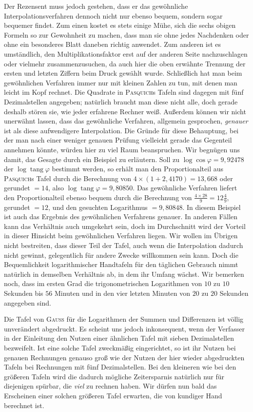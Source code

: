 Der Rezensent muss jedoch gestehen, dass er das gewöhnliche Interpolationsverfahren dennoch nicht nur ebenso bequem, sondern sogar bequemer findet. Zum einen kostet es stets einige Mühe, sich die sechs obigen Formeln so zur Gewohnheit zu machen, dass man sie ohne jedes Nachdenken oder ohne ein besonderes Blatt daneben richtig anwendet. Zum anderen ist es umständlich, den Multiplikationsfaktor erst auf der anderen Seite nachzuschlagen oder vielmehr zusammenzusuchen, da auch hier die oben erwähnte Trennung der ersten und letzten Ziffern beim Druck gewählt wurde. Schließlich hat man beim gewöhnlichen Verfahren immer nur mit kleinen Zahlen zu tun, mit denen man leicht im Kopf rechnet. Die Quadrate in \textsc{Pasquich}s Tafeln sind dagegen mit fünf Dezimalstellen angegeben; natürlich braucht man diese nicht alle, doch gerade deshalb stören sie, wie jeder erfahrene Rechner weiß. Außerdem können wir nicht unerwähnt lassen, dass das gewöhnliche Verfahren, allgemein gesprochen, \textit{genauer} ist als diese aufwendigere Interpolation. Die Gründe für diese Behauptung, bei der man nach einer weniger genauen Prüfung vielleicht gerade das Gegenteil annehmen könnte, würden hier zu viel Raum beanspruchen. Wir begnügen uns damit, das Gesagte durch ein Beispiel zu erläutern. Soll zu \(\log\cos\varphi=9{,}92478\) der \(\log\operatorname{tang}\varphi\) bestimmt werden, so erhält man den Proportionalteil aus \textsc{Pasquich}s Tafel durch die Berechnung von \(4\times(1+2{,}4170)=13{,}668\) oder gerundet \(=14\), also \(\log\operatorname{tang}\varphi=9{,}80850\). Das gewöhnliche Verfahren liefert den Proportionalteil ebenso bequem durch die Berechnung von \(\frac{4\times28}{9}=12\frac49\), gerundet \(=12\), und den gesuchten Logarithmus \(=9{,}80848\). In diesem Beispiel ist auch das Ergebnis des gewöhnlichen Verfahrens genauer. In anderen Fällen kann das Verhältnis auch umgekehrt sein, doch im Durchschnitt wird der Vorteil in dieser Hinsicht beim gewöhnlichen Verfahren liegen. Wir wollen im Übrigen nicht bestreiten, dass dieser Teil der Tafel, auch wenn die Interpolation dadurch nicht gewinnt, gelegentlich für 
andere Zwecke willkommen sein kann. Doch die Bequemlichkeit logarithmischer Handtafeln für den täglichen Gebrauch nimmt natürlich in demselben Verhältnis ab, in dem ihr Umfang wächst. Wir bemerken noch, dass im ersten Grad die trigonometrischen Logarithmen von \(10\) zu \(10\) Sekunden bis \(56\) Minuten und in den vier letzten Minuten von \(20\) zu \(20\) Sekunden angegeben sind.

Die Tafel von \textsc{Gauss} für die Logarithmen der Summen und Differenzen ist völlig unverändert abgedruckt. Es scheint uns jedoch inkonsequent, wenn der Verfasser in der Einleitung den Nutzen einer ähnlichen Tafel mit sieben Dezimalstellen bezweifelt. Ist eine solche Tafel zweckmäßig eingerichtet, so ist ihr Nutzen bei genauen Rechnungen genauso groß wie der Nutzen der hier wieder abgedruckten Tafeln bei Rechnungen mit fünf Dezimalstellen. Bei den kleineren wie bei den größeren Tafeln wird die dadurch mögliche Zeitersparnis natürlich nur für diejenigen spürbar, die \textit{viel} zu rechnen haben. Wir dürfen nun bald das Erscheinen einer solchen größeren Tafel erwarten, die von kundiger Hand berechnet ist.

